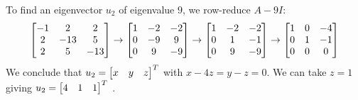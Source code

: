 \documentclass[a4paper]{article}
\begin{document}
\begin{solution}
\begin{itemize}
   To find an eigenvector $u_2$ of eigenvalue $9$, we row-reduce $A-9I$:
   \[
    \left[\begin{matrix}
    -1&2&2\\
    2&-13&5\\
    2&5&-13\\
    \end{matrix}\right]
    \to
    \left[\begin{matrix}
    1&-2&-2\\
    0&-9&9\\
    0&9&-9\\
    \end{matrix}\right]
    \to
    \left[\begin{matrix}
    1&-2&-2\\
    0&1&-1\\
    0&9&-9\\
    \end{matrix}\right]
    \to
    \left[\begin{matrix}
    1&0&-4\\
    0&1&-1\\
    0&0&0\\
    \end{matrix}\right]
   \]
   We conclude that $u_2=\left[\begin{matrix} x&y&z\end{matrix}\right]^T$ with $x-4z=y-z=0$.  We can
   take $z=1$ giving $u_2=\left[\begin{matrix} 4&1&1 \end{matrix}\right]^T$ .
   

\end{itemize}
\end{solution}
\end{document}
